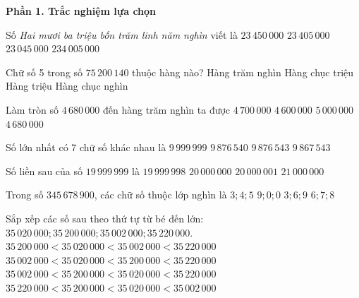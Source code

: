 \textbf{Phần 1. Trắc nghiệm lựa chọn}

\begin{ex} %
Số \textit{Hai mươi ba triệu bốn trăm linh năm nghìn} viết là
\choice
{$23\,450\,000$}
{\True $23\,405\,000$}
{$23\,045\,000$}
{$234\,005\,000$}
\end{ex}

\begin{ex} %
Chữ số 5 trong số $75\,200\,140$ thuộc hàng nào?
\choice
{Hàng trăm nghìn}
{Hàng chục triệu}
{\True Hàng triệu}
{Hàng chục nghìn}
\end{ex}

\begin{ex} %
Làm tròn số $4\,680\,000$ đến hàng trăm nghìn ta được
\choice
{\True $4\,700\,000$}
{$4\,600\,000$}
{$5\,000\,000$}
{$4\,680\,000$}
\end{ex}

\begin{ex} %
Số lớn nhất có 7 chữ số khác nhau là
\choice
{$9\,999\,999$}
{$9\,876\,540$}
{\True $9\,876\,543$}
{$9\,867\,543$}
\end{ex}

\begin{ex} %
Số liền sau của số $19\,999\,999$ là
\choice
{$19\,999\,998$}
{\True $20\,000\,000$}
{$20\,000\,001$}
{$21\,000\,000$}
\end{ex}

\begin{ex} %
Trong số $345\,678\,900$, các chữ số thuộc lớp nghìn là
\choice
{$3; 4; 5$}
{$9; 0; 0$}
{$3; 6; 9$}
{\True $6; 7; 8$}
\end{ex}

\begin{ex} %
Sắp xếp các số sau theo thứ tự từ bé đến lớn: $35\,020\,000; 35\,200\,000; 35\,002\,000; 35\,220\,000$.
\choice
{$35\,200\,000 < 35\,020\,000 < 35\,002\,000 < 35\,220\,000$}
{\True $35\,002\,000 < 35\,020\,000 < 35\,200\,000 < 35\,220\,000$}
{$35\,002\,000 < 35\,200\,000 < 35\,020\,000 < 35\,220\,000$}
{$35\,220\,000 < 35\,200\,000 < 35\,020\,000 < 35\,002\,000$}
\end{ex}

